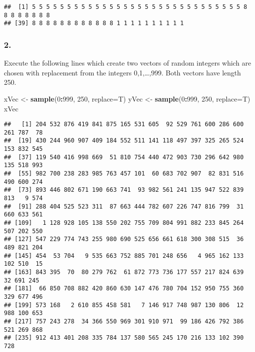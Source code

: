 \documentclass[
]{article}
\newenvironment{Shaded}{\begin{snugshade}}{\end{snugshade}}
\newcommand{\AttributeTok}[1]{\textcolor[rgb]{0.13,0.29,0.53}{#1}}
\newcommand{\DecValTok}[1]{\textcolor[rgb]{0.00,0.00,0.81}{#1}}
\newcommand{\FunctionTok}[1]{\textcolor[rgb]{0.13,0.29,0.53}{\textbf{#1}}}
\newcommand{\NormalTok}[1]{#1}
\newcommand{\OtherTok}[1]{\textcolor[rgb]{0.56,0.35,0.01}{#1}}
\newcommand{\SpecialCharTok}[1]{\textcolor[rgb]{0.81,0.36,0.00}{\textbf{#1}}}
\begin{document}
\begin{verbatim}
##  [1] 5 5 5 5 5 5 5 5 5 5 5 5 5 5 5 5 5 5 5 5 5 5 5 5 5 5 5 5 5 5 8 8 8 8 8 8 8 8
## [39] 8 8 8 8 8 8 8 8 8 8 8 8 1 1 1 1 1 1 1 1 1 1
\end{verbatim}

\subsubsection{2.}\label{section-1}

Execute the following lines which create two vectors of random integers
which are chosen with replacement from the integers 0,1,\ldots,999. Both
vectors have length 250.

\begin{Shaded}
\begin{Highlighting}[]
\NormalTok{ xVec }\OtherTok{\textless{}{-}} \FunctionTok{sample}\NormalTok{(}\DecValTok{0}\SpecialCharTok{:}\DecValTok{999}\NormalTok{, }\DecValTok{250}\NormalTok{, }\AttributeTok{replace=}\NormalTok{T)}
\NormalTok{ yVec }\OtherTok{\textless{}{-}} \FunctionTok{sample}\NormalTok{(}\DecValTok{0}\SpecialCharTok{:}\DecValTok{999}\NormalTok{, }\DecValTok{250}\NormalTok{, }\AttributeTok{replace=}\NormalTok{T)}
\NormalTok{ xVec}
\end{Highlighting}
\end{Shaded}

\begin{verbatim}
##   [1] 204 532 876 419 841 875 165 531 605  92 529 761 600 286 600 261 787  78
##  [19] 430 244 960 907 409 184 552 511 141 118 497 397 325 265 524 153 832 545
##  [37] 119 540 416 998 669  51 810 754 440 472 903 730 296 642 980 135 518 993
##  [55] 982 700 238 283 985 763 457 101  60 683 702 907  82 831 516 490 600 274
##  [73] 893 446 802 671 190 663 741  93 982 561 241 135 947 522 839 813   9 574
##  [91] 288 404 525 523 311  87 663 444 782 607 226 747 816 799  31 660 633 561
## [109]   1 128 928 105 138 550 202 755 709 804 991 882 233 845 264 507 202 550
## [127] 547 229 774 743 255 980 690 525 656 661 618 300 308 515  36 489 821 204
## [145] 454  53 704   9 535 663 752 885 701 248 656   4 965 162 133 102 510  15
## [163] 843 395  70  80 279 762  61 872 773 736 177 557 217 824 639  32 691 245
## [181]  66 850 708 882 420 860 630 147 476 780 704 152 950 755 360 329 677 496
## [199] 573 168   2 610 855 458 581   7 146 917 748 987 130 806  12 988 100 653
## [217] 757 243 278  34 366 550 969 301 910 971  99 186 426 792 386 521 269 868
## [235] 912 413 401 208 335 784 137 580 565 245 170 216 133 102 390 728
\end{verbatim}
\end{document}
